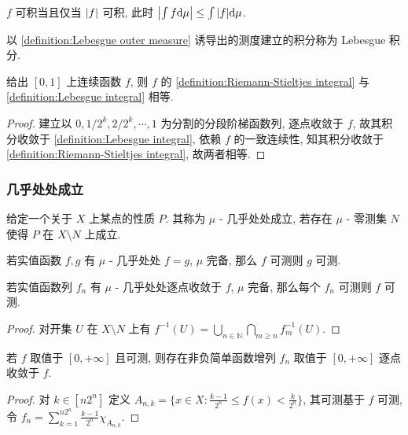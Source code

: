 \begin{corollary}
    \(f\) 可积当且仅当 \(\abs {f}\) 可积, 此时 \(\abs {\int f \dd \mu} \leq \int \abs {f} \dd \mu\).
\end{corollary}

\begin{definition}[Lebesgue 积分]
    \label {definition:Lebesgue integral}
    以 \ref{definition:Lebesgue outer measure} 诱导出的测度建立的积分称为 Lebesgue 积分.
\end{definition}

\begin{lemma}
    给出 \([0,1]\) 上连续函数 \(f\), 则 \(f\) 的 \ref{definition:Riemann-Stieltjes integral} 与 \ref{definition:Lebesgue integral} 相等.

    \begin{proof}
        建立以 \(0,1/2^k,2/2^k,\cdots,1\) 为分割的分段阶梯函数列, 逐点收敛于 \(f\), 故其积分收敛于 \ref{definition:Lebesgue integral}, 依赖 \(f\) 的一致连续性, 知其积分收敛于 \ref{definition:Riemann-Stieltjes integral},
        故两者相等.
    \end{proof}
\end{lemma}

\subsubsection{几乎处处成立}

\begin{definition}
    给定一个关于 \(X\) 上某点的性质 \(P\). 其称为 \(\mu\) - 几乎处处成立, 若存在 \(\mu\) - 零测集 \(N\) 使得 \(P\) 在 \(X \setminus N\) 上成立.
\end{definition}

\begin{lemma}
    若实值函数 \(f,g\) 有 \(\mu\) - 几乎处处 \(f = g\), \(\mu\) 完备, 那么 \(f\) 可测则 \(g\) 可测.
\end{lemma}

\begin{lemma}
    若实值函数列 \(f_n\) 有 \(\mu\) - 几乎处处逐点收敛于 \(f\), \(\mu\) 完备, 那么每个 \(f_n\) 可测则 \(f\) 可测.

    \begin{proof}
        对开集 \(U\) 在 \(X \setminus N\) 上有 \(f^{-1} (U) = \bigcup_{n \in \mathbb{N}} \bigcap_{m \geq n} f_m^{-1} (U)\).
    \end{proof}
\end{lemma}

\begin{lemma}
    若 \(f\) 取值于 \([0,+\infty]\) 且可测, 则存在非负简单函数增列 \(f_n\) 取值于 \([0,+\infty]\) 逐点收敛于 \(f\).

    \begin{proof}
        对 \(k \in [n 2^n]\) 定义 \(A_{n,k} = \{x \in X : \frac{k-1}{2^n} \leq f(x) < \frac{k}{2^n}\}\), 其可测基于 \(f\) 可测,
        令 \(f_n = \sum_{k=1}^{n 2^n} \frac{k-1}{2^n} \chi_{A_{n,k}}\).
    \end{proof}
\end{lemma}

